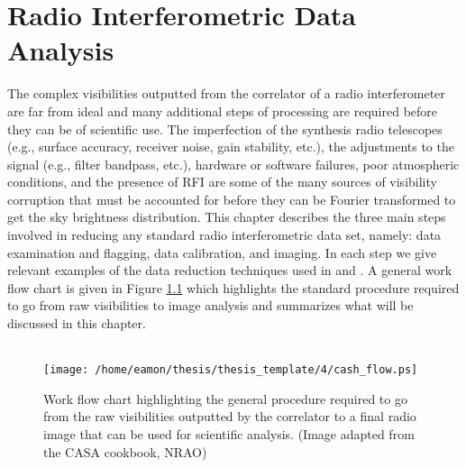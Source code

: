 
\chapter{Radio Interferometric Data Analysis} \label{chap:4}

The complex visibilities outputted from the correlator of a radio interferometer are far from ideal and many additional steps of processing are required before they can be of scientific use. The imperfection of the synthesis radio telescopes (e.g., surface accuracy, receiver noise, gain stability, etc.), the adjustments to the signal (e.g., filter bandpass, etc.), hardware or software failures, poor atmospheric conditions, and the presence of RFI are some of the many sources of visibility corruption that must be accounted for before they can be Fourier transformed to get the sky brightness distribution. This chapter describes the three main steps involved in reducing any standard radio interferometric data set, namely: data examination and flagging, data calibration, and imaging. In each step we give relevant examples of the data reduction techniques used in \cite{ogorman_2012} and \cite{ogorman_2013}. A general work flow chart is given in Figure \ref{fig:4.1} which highlights the standard procedure required to go from raw visibilities to image analysis and summarizes what will be discussed in this chapter.\\
\\
\begin{figure}[hbt!]
\centering 
          \texttt{[image: /home/eamon/thesis/thesis\_template/4/cash\_flow.ps]}
\caption[Radio interferometry work flow chart.]{Work flow chart highlighting the general procedure required to go from the raw visibilities outputted by the correlator to a final radio image that can be used for scientific analysis. (Image adapted from the CASA cookbook, NRAO)}
\label{fig:4.1}
\end{figure}

